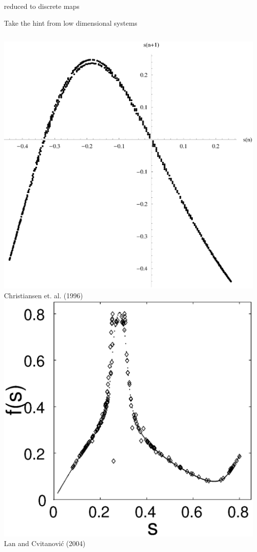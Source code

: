 \documentclass{beamer}
\begin{document}
\begin{frame}{{\KSe} reduced to discrete maps}
  \begin{block}{Take the hint from low dimensional systems}
  \begin{columns}
	\includegraphics[width=\textwidth,clip=true]{../../figs/sPoincarePlot.eps}\\
	Christiansen et. al. (1996)
	\includegraphics[width=\textwidth,clip=true]{../../figs/lanRM}\\
	Lan and Cvitanovi\'c (2004)
 \end{columns}
 \end{block}
\end{frame}
\end{document}
